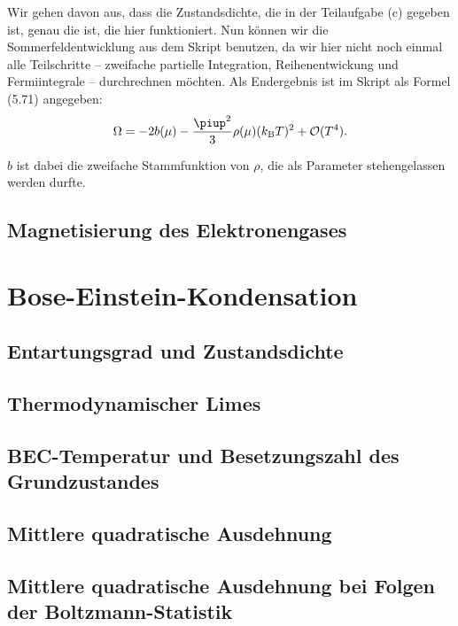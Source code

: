 Wir gehen davon aus, dass die Zustandsdichte, die in der Teilaufgabe (c)
gegeben ist, genau die ist, die hier funktioniert. Nun können wir die
Sommerfeldentwicklung aus dem Skript benutzen, da wir hier nicht noch einmal
alle Teilschritte – zweifache partielle Integration, Reihenentwickung und
Fermiintegrale – durchrechnen möchten. Als Endergebnis ist im Skript als Formel
(5.71) angegeben:
\[
    \Omega = - 2 b(\mu) - \frac{\piup^2}3 \rho(\mu) (\kB T)^2 + \mathcal
    O(T^4).
\]

$b$ ist dabei die zweifache Stammfunktion von $\rho$, die als Parameter
stehengelassen werden durfte.

\subsection{Magnetisierung des Elektronengases}

\fehlt

\section{Bose-Einstein-Kondensation}

\subsection{Entartungsgrad und Zustandsdichte}

\fehlt

\subsection{Thermodynamischer Limes}

\fehlt

\subsection{BEC-Temperatur und Besetzungszahl des Grundzustandes}

\fehlt

\subsection{Mittlere quadratische Ausdehnung}

\fehlt

\subsection{Mittlere quadratische Ausdehnung bei Folgen der Boltzmann-Statistik}

